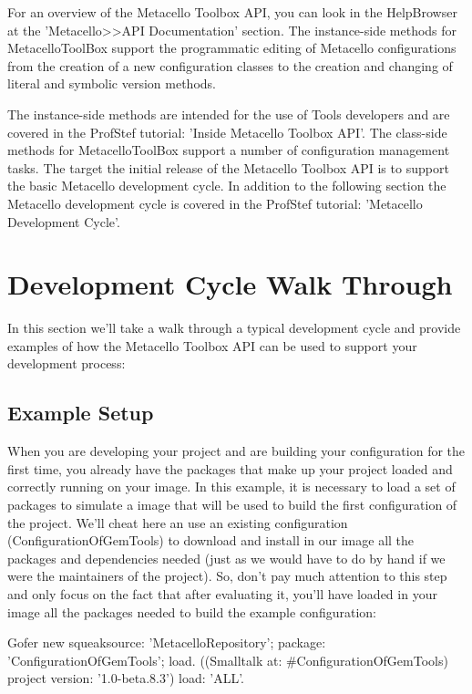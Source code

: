 \documentclass[a4paper,10pt,twoside]{book}
\begin{document}
For an overview of the Metacello Toolbox API, you can look in the HelpBrowser at the 'Metacello>>API Documentation' section. The instance-side methods for MetacelloToolBox support the  programmatic editing of Metacello configurations from the creation of a new configuration classes to the creation and changing of literal and symbolic version methods.

The instance-side methods are intended for the use of Tools developers and are covered in the ProfStef tutorial: 'Inside Metacello Toolbox API'. The class-side methods for MetacelloToolBox support a number of configuration management tasks. The target the initial release of the Metacello Toolbox API is to support the basic Metacello development cycle. In addition to the following section the Metacello development cycle is covered in the ProfStef tutorial: 'Metacello Development Cycle'.


\section{Development Cycle Walk Through}

In this section we'll take a walk through a typical development cycle and provide examples of how the Metacello Toolbox API can be used to support your development process:

\subsection{Example Setup}

When you are developing your project and are building your configuration for the first time, you already have the packages that make up your project loaded and correctly running on your image. In this example, it is necessary to load a set of packages to simulate a image that will be used to build the first configuration of the project. We'll cheat here an use an existing configuration (ConfigurationOfGemTools) to download and install in our image all the packages and dependencies needed (just as we would have to do by hand if we were the maintainers of the project). So, don't pay much attention to this step and only focus on the fact that after evaluating it, you'll have loaded in your image all the packages needed to build the example configuration:

\begin{code}{}
Gofer new
  squeaksource: 'MetacelloRepository';
  package: 'ConfigurationOfGemTools';
  load.
((Smalltalk at: #ConfigurationOfGemTools) project version: '1.0-beta.8.3')
  load: 'ALL'.
\end{code}
\end{document}
